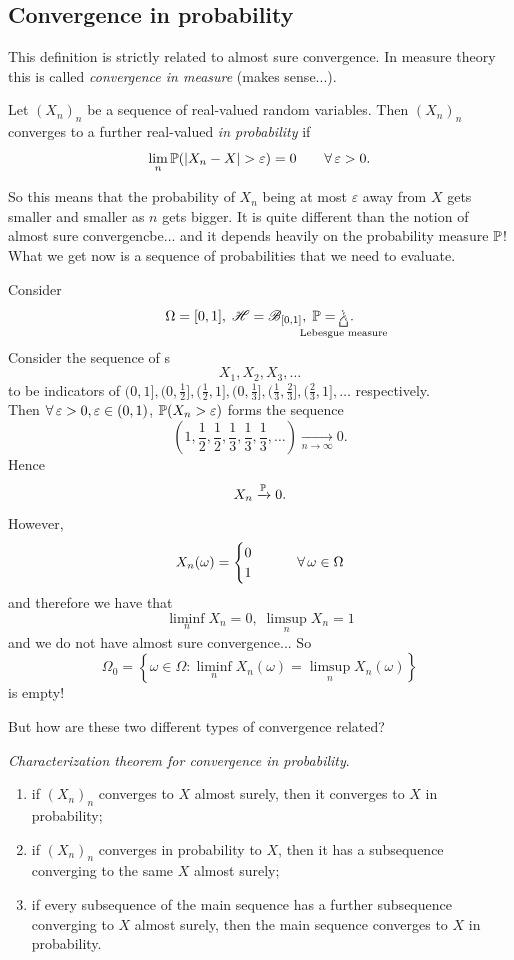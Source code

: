 \documentclass{report}
\begin{document}
\subsection{Convergence in probability}
This definition is strictly related to almost sure convergence. In measure theory this is called \textit{convergence in measure} (makes sense...).
\begin{definition}
	Let ${(X_n)}_{n}$ be a sequence of real-valued random variables. Then ${(X_n)}_{n}$ converges to a further real-valued \rv{} \emph{in probability} if 
	\[\lim_n\pr(|X_n-X|>\varepsilon)=0\qquad\every\varepsilon>0.\]
\end{definition}
So this means that the probability of $X_n$ being at most $\varepsilon$ away from $X$ gets smaller and smaller as $n$ gets bigger. It is quite different than the notion of almost sure convergencbe... and it depends heavily on the probability measure $\mathbb{P}$!
What we get now is a sequence of probabilities that we need to evaluate. 
\begin{example}
	Consider
	\[\Omega=[0,1],\;\HS=\B_{[0,1]},\;\pr=\underbracket[0.6pt]{\leb}_{\mathclap{\text{Lebesgue measure}}}.\]
	Consider the sequence of \rv s
	\[X_1,X_2,X_3,\ldots\]
	to be indicators of $(0,1],(0,\frac{1}{2}],(\frac{1}{2},1],(0,\frac{1}{3}],(\frac{1}{3},\frac{2}{3}],(\frac{2}{3},1],\ldots$ respectively.\\
	Then $\forall\,\varepsilon>0,\varepsilon\in(0,1)$, $\mathbb{P}(X_n>\varepsilon)$ forms the sequence
	\[(1,\frac{1}{2},\frac{1}{2},\frac{1}{3},\frac{1}{3},\frac{1}{3},\ldots)\xrightarrow[n\to\infty]{}0.\]
	Hence 
	\[X_n\xrightarrow[]{\mathbb{P}}0.\]
	However,
	\[X_n(\omega)=\begin{cases}
		0\\		1
	\end{cases}\qquad\forall\,\omega\in\Omega\]
	and therefore we have that 
	\[\liminf_n X_n=0,\;\limsup_n X_n=1\]
	and we do not have almost sure convergence... So \[\Omega_0=\left\{\omega\in\Omega:\liminf_n X_n(\omega)=\limsup_n X_n(\omega)\right\}\] is empty!
\end{example}
But how are these two different types of convergence related?
\begin{theorem}
	\emph{Characterization theorem for convergence in probability}. 
	\begin{enumerate}[label=\textit{\roman*})]
		\item \label{ehehe} if ${(X_n)}_{n}$ converges to $X$ almost surely, then it converges to $X$ in probability;
		\item \label{ehehe2} if ${(X_n)}_{n}$ converges in probability to $X$, then it has a subsequence converging to the same \rv{} $X$ almost surely;
		\item \label{ehehe3} if every subsequence of the main sequence has a further subsequence converging to $X$ almost surely, then the main sequence converges to $X$ in probability.
	\end{enumerate}
\end{theorem}
\end{document}
